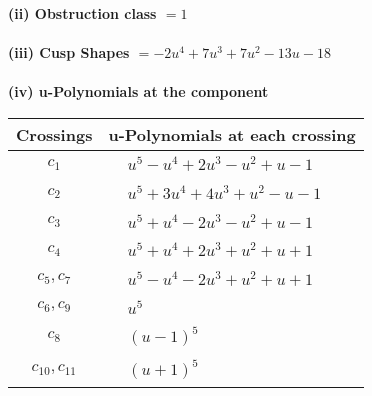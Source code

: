 \documentclass[1p]{elsarticle_modified}
\theoremstyle{definition}
\begin{document}
\flushleft \textbf{(ii) Obstruction class $= 1$}\\~\\
\flushleft \textbf{(iii) Cusp Shapes $= -2 u^4+7 u^3+7 u^2-13 u-18$}\\~\\
\newpage\renewcommand{\arraystretch}{1}
\flushleft \textbf{(iv) u-Polynomials at the component}\newline \\
\begin{tabular}{m{50pt}|m{274pt}}
Crossings & \hspace{64pt}u-Polynomials at each crossing \\
\hline $$\begin{aligned}c_{1}\end{aligned}$$&$\begin{aligned}
&u^5- u^4+2 u^3- u^2+u-1
\end{aligned}$\\
\hline $$\begin{aligned}c_{2}\end{aligned}$$&$\begin{aligned}
&u^5+3 u^4+4 u^3+u^2- u-1
\end{aligned}$\\
\hline $$\begin{aligned}c_{3}\end{aligned}$$&$\begin{aligned}
&u^5+u^4-2 u^3- u^2+u-1
\end{aligned}$\\
\hline $$\begin{aligned}c_{4}\end{aligned}$$&$\begin{aligned}
&u^5+u^4+2 u^3+u^2+u+1
\end{aligned}$\\
\hline $$\begin{aligned}c_{5},c_{7}\end{aligned}$$&$\begin{aligned}
&u^5- u^4-2 u^3+u^2+u+1
\end{aligned}$\\
\hline $$\begin{aligned}c_{6},c_{9}\end{aligned}$$&$\begin{aligned}
&u^5
\end{aligned}$\\
\hline $$\begin{aligned}c_{8}\end{aligned}$$&$\begin{aligned}
&(u-1)^5
\end{aligned}$\\
\hline $$\begin{aligned}c_{10},c_{11}\end{aligned}$$&$\begin{aligned}
&(u+1)^5
\end{aligned}$\\
\hline
\end{tabular}\\~\\
\end{document}
